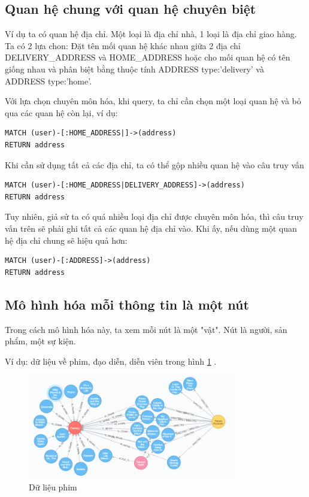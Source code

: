 \subsection{Quan hệ chung với quan hệ chuyên biệt}

Ví dụ ta có quan hệ địa chỉ. Một loại là địa chỉ nhà, 1 loại là địa chỉ giao hàng. Ta có 2 lựa chon: Đặt tên mối quan hệ khác nhau giữa 2 địa chỉ  DELIVERY\_ADDRESS và HOME\_ADDRESS hoặc cho mối quan hệ có tên giống nhau và phân biệt bằng thuộc tính ADDRESS {type:'delivery'} và ADDRESS {type:'home'}.

Với lựa chọn chuyên môn hóa, khi query, ta chỉ cần chọn một loại quan hệ và bỏ qua các quan hệ còn lại, ví dụ: 

\begin{lstlisting}[caption={Quan hệ chuyên biệt}, label={lst:cypherdune}]
MATCH (user)-[:HOME_ADDRESS|]->(address)
RETURN address
\end{lstlisting}

Khi cần sử dụng tất cả các địa chỉ, ta có thể gộp nhiều quan hệ vào câu truy vấn 

\begin{lstlisting}[caption={Chọn hết quan hệ địa chỉ }, label={lst:cypherdune}]
MATCH (user)-[:HOME_ADDRESS|DELIVERY_ADDRESS]->(address)
RETURN address
\end{lstlisting}

Tuy nhiên, giả sử ta có quá nhiều loại địa chỉ được chuyên môn hóa, thì câu truy vấn trên sẽ phải ghi tất cả các quan hệ địa chỉ vào. Khi ấy, nếu dùng một quan hệ địa chỉ chung sẽ hiệu quả hơn: 

\begin{lstlisting}[caption={Quan hệ chung}, label={lst:cypherdune}]
MATCH (user)-[:ADDRESS]->(address)
RETURN address
\end{lstlisting}


\subsection{Mô hình hóa mỗi thông tin là một nút}
Trong cách mô hình hóa này, ta xem mỗi nút là một "vật". Nút là người, sản phẩm, một sự kiện.

Ví dụ: dữ liệu về phim, đạo diễn, diễn viên trong hình \ref{fig:movie} .

\begin{figure}[h]
\centering
\includegraphics[width=0.8\textwidth]{image/spirit_g.PNG}
\caption{\label{fig:movie} Dữ liệu phim }
\end{figure}

